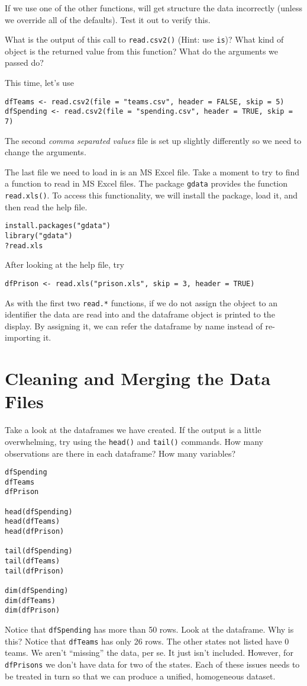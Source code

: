 If we use one of the other functions, \R{} will get structure the data
incorrectly (unless we override all of the defaults). Test it out to
verify this. 

What is the output of this call to \texttt{read.csv2()} (Hint: use
\texttt{is})? What kind of object is the returned value from this
function? What do the arguments we passed do?

This time, let's use
\begin{verbatim}
dfTeams <- read.csv2(file = "teams.csv", header = FALSE, skip = 5)
dfSpending <- read.csv2(file = "spending.csv", header = TRUE, skip = 7)
\end{verbatim}

The second \textit{comma separated values} file is set up slightly
differently so we need to change the arguments.

The last file we need to load in is an MS Excel file. Take a moment to
try to find a function to read in MS Excel files. The package
\texttt{gdata} provides the function \texttt{read.xls()}. To access
this functionality, we will install the package, load it, and then
read the help file.

\begin{verbatim}
install.packages("gdata")
library("gdata")
?read.xls
\end{verbatim}

After looking at the help file, try
\begin{verbatim}
dfPrison <- read.xls("prison.xls", skip = 3, header = TRUE)
\end{verbatim}

As with the first two \texttt{read.*} functions, if we do not assign
the object to an identifier the data are read into \R{} and the
dataframe object is printed to the display. By assigning it, we can
refer the dataframe by name instead of re-importing it.

\section{Cleaning and Merging the Data Files}
Take a look at the dataframes we have created. If the output is a
little overwhelming, try using the \texttt{head()} and \texttt{tail()}
commands. How many observations are there in each dataframe? How many
variables?
\begin{verbatim}
dfSpending
dfTeams
dfPrison

head(dfSpending)
head(dfTeams)
head(dfPrison)

tail(dfSpending)
tail(dfTeams)
tail(dfPrison)

dim(dfSpending)
dim(dfTeams)
dim(dfPrison)
\end{verbatim}
Notice that \texttt{dfSpending} has more than 50 rows. Look at the
dataframe. Why is this? Notice that \texttt{dfTeams} has only 26
rows. The other states not listed have 0 teams. We aren't ``missing''
the data, per se. It just isn't included. However, for
\texttt{dfPrisons} we don't have data for two of the states. Each of
these issues needs to be treated in turn so that we can produce a
unified, homogeneous dataset.

